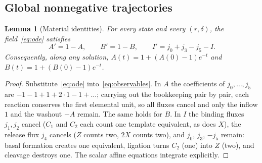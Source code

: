 \documentclass[11pt,a4paper]{article}
\theoremstyle{plain}
\newtheorem{lemma}[theorem]{Lemma}
\theoremstyle{definition}
\theoremstyle{remark}
\newcommand{\Iv}{I}
\begin{document}
\subsection{Global nonnegative trajectories}
\begin{lemma}[Material identities]\label{lem:material}
For every state and every $(r,\delta)$, the field~\eqref{eq:ode} satisfies
\begin{equation}\label{eq:materialid}
A'=1-A,\qquad B'=1-B,\qquad \Iv'=j_0+j_3-j_5-\Iv .
\end{equation}
Consequently, along any solution, $A(t)=1+(A(0)-1)e^{-t}$ and $B(t)=1+(B(0)-1)e^{-t}$.
\end{lemma}
\begin{proof}
Substitute~\eqref{eq:ode} into~\eqref{eq:observables}. In $A$ the coefficients of $j_0,\dots,j_5$ are $-1-1+1+2\cdot1-1+\dots$; carrying out the bookkeeping pair by pair, each reaction conserves the first elemental unit, so all fluxes cancel and only the inflow $1$ and the washout $-A$ remain. The same holds for $B$. In $\Iv$ the binding fluxes $j_1,j_2$ cancel ($C_1$ and $C_2$ each count one template equivalent, as does $X$), the release flux $j_4$ cancels ($Z$ counts two, $2X$ counts two), and $j_0$, $j_3$, $-j_5$ remain: basal formation creates one equivalent, ligation turns $C_2$ (one) into $Z$ (two), and cleavage destroys one. The scalar affine equations integrate explicitly.
\end{proof}
\end{document}

